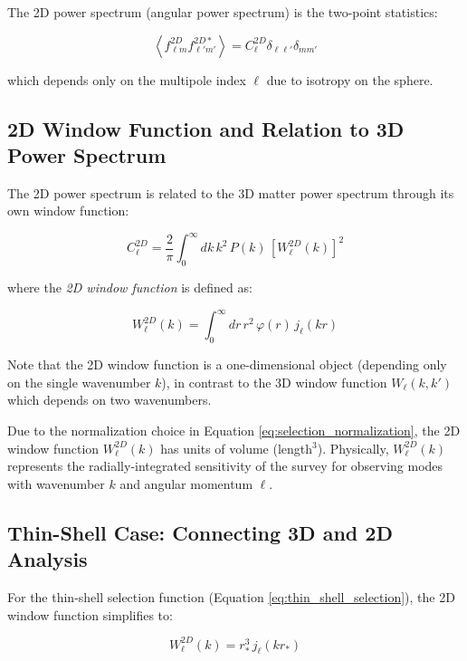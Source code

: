 The 2D power spectrum (angular power spectrum) is the two-point statistics:

\begin{equation}
\left\langle f_{\ell m}^{2D} f_{\ell' m'}^{2D*} \right\rangle = C_\ell^{2D} \delta_{\ell\ell'} \delta_{m m'}
\label{eq:2d_power_spectrum}
\end{equation}

which depends only on the multipole index $\ell$ due to isotropy on the sphere.

\subsection{2D Window Function and Relation to 3D Power Spectrum}

The 2D power spectrum is related to the 3D matter power spectrum through its own window function:

\begin{equation}
C_\ell^{2D} = \frac{2}{\pi} \int_0^\infty dk \, k^2 \, P(k) \, \left[ W_\ell^{2D}(k) \right]^2
\label{eq:2d_cl_relation}
\end{equation}

where the \emph{2D window function} is defined as:

\begin{equation}
W_\ell^{2D}(k) = \int_0^\infty dr \, r^2 \, \varphi(r) \, j_\ell(kr)
\label{eq:2d_window_function}
\end{equation}

Note that the 2D window function is a one-dimensional object (depending only on the single wavenumber $k$), in contrast to the 3D window function $W_\ell(k, k')$ which depends on two wavenumbers.

Due to the normalization choice in Equation \ref{eq:selection_normalization}, the 2D window function $W_\ell^{2D}(k)$ has units of volume (length$^3$). Physically, $W_\ell^{2D}(k)$ represents the radially-integrated sensitivity of the survey for observing modes with wavenumber $k$ and angular momentum $\ell$.

\subsection{Thin-Shell Case: Connecting 3D and 2D Analysis}

For the thin-shell selection function (Equation \ref{eq:thin_shell_selection}), the 2D window function simplifies to:

\begin{equation}
W_\ell^{2D}(k) = r_*^3 \, j_\ell(k r_*)
\label{eq:thin_shell_2d_window}
\end{equation}

